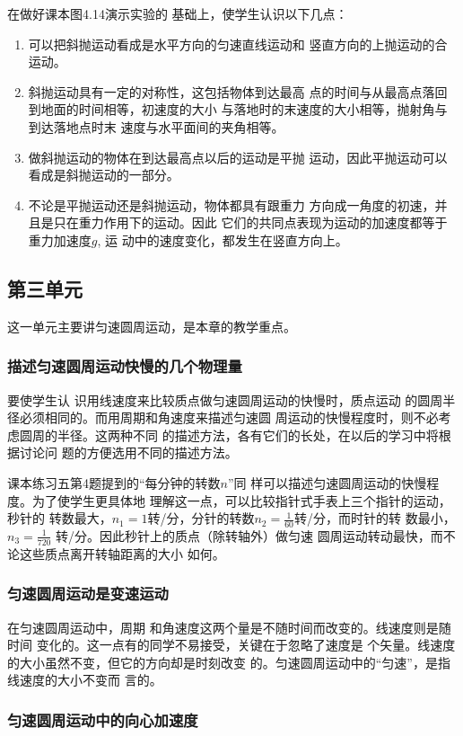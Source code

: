 在做好课本图4.14演示实验的
基础上，使学生认识以下几点：
\begin{enumerate}
\item 可以把斜抛运动看成是水平方向的匀速直线运动和
竖直方向的上抛运动的合运动。
\item 斜抛运动具有一定的对称性，这包括物体到达最高
点的时间与从最高点落回到地面的时间相等，初速度的大小
与落地时的末速度的大小相等，抛射角与到达落地点时末
速度与水平面间的夹角相等。
\item 做斜抛运动的物体在到达最高点以后的运动是平抛
运动，因此平抛运动可以看成是斜抛运动的一部分。
\item 不论是平抛运动还是斜抛运动，物体都具有跟重力
方向成一角度的初速，并且是只在重力作用下的运动。因此
它们的共同点表现为运动的加速度都等于重力加速度$g$, 运
动中的速度变化，都发生在竖直方向上。
\end{enumerate}

\subsection{第三单元}
这一单元主要讲匀速圆周运动，是本章的教学重点。
\subsubsection{描述匀速圆周运动快慢的几个物理量}
要使学生认
识用线速度来比较质点做匀速圆周运动的快慢时，质点运动
的圆周半径必须相同的。而用周期和角速度来描述匀速圆
周运动的快慢程度时，则不必考虑圆周的半径。这两种不同
的描述方法，各有它们的长处，在以后的学习中将根据讨论问
题的方便选用不同的描述方法。

课本练习五第4题提到的“每分钟的转数$n$”同
样可以描述匀速圆周运动的快慢程度。为了使学生更具体地
理解这一点，可以比较指针式手表上三个指针的运动，秒针的
转数最大，$n_1=1$转/分，分针的转数$n_2=\frac{1}{60}
$转/分，而时针的转
数最小，$n_3=\frac{1}{720}$
转/分。因此秒针上的质点（除转轴外）做匀速
圆周运动转动最快，而不论这些质点离开转轴距离的大小
如何。

\subsubsection{匀速圆周运动是变速运动}

在匀速圆周运动中，周期
和角速度这两个量是不随时间而改变的。线速度则是随时间
变化的。这一点有的同学不易接受，关键在于忽略了速度是
个矢量。线速度的大小虽然不变，但它的方向却是时刻改变
的。匀速圆周运动中的“匀速”，是指线速度的大小不变而
言的。

\subsubsection{匀速圆周运动中的向心加速度}

